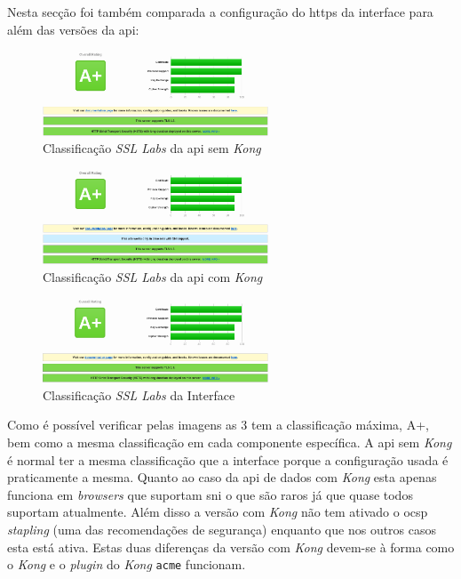 Nesta secção foi também comparada a configuração do \acrshort{https} da interface para além das versões da \acrshort{api}:
\begin{figure}[H]
    \centering
    \includegraphics[width=0.6\textwidth]{img/sslLabsAPISemKong.png}
    \caption{Classificação \textit{SSL Labs} da \acrshort{api} sem \textit{Kong}}
\end{figure}
\begin{figure}[H]
    \centering
    \includegraphics[width=0.6\textwidth]{img/sslLabsAPIComKong.png}
    \caption{Classificação \textit{SSL Labs} da \acrshort{api} com \textit{Kong}}
\end{figure}
\begin{figure}[H]
    \centering
    \includegraphics[width=0.6\textwidth]{img/sslLabsInterface.png}
    \caption{Classificação \textit{SSL Labs} da Interface}
\end{figure}

Como é possível verificar pelas imagens as 3 tem a classificação máxima, A+, bem como a mesma classificação em cada componente específica. A \acrshort{api} sem \textit{Kong} é normal ter a mesma classificação que a interface porque a configuração usada é praticamente a mesma. Quanto ao caso da \acrshort{api} de dados com \textit{Kong} esta apenas funciona em \textit{browsers} que suportam \acrshort{sni} o que são raros já que quase todos suportam atualmente. Além disso a versão com \textit{Kong} não tem ativado o \acrshort{ocsp} \textit{stapling} (uma das recomendações de segurança) enquanto que nos outros casos esta está ativa. Estas duas diferenças da versão com \textit{Kong} devem-se à forma como o \textit{Kong} e o \textit{plugin} do \textit{Kong} \texttt{acme} funcionam.

